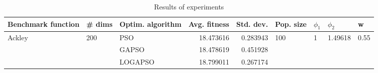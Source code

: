 \begin{table}
\centering
\caption{Results of experiments}
\begin{tabular}{lllrrllll}
\toprule
     Benchmark function &              \# dims & Optim. algorithm &  Avg. fitness &  Std. dev. &            Pop. size &         $\phi_{1}$ &               $\phi_{2}$ &                     w \\
\midrule
\multirow{3}{*}{Ackley} & \multirow{3}{*}{200} &              PSO &     18.473616 &   0.283943 & \multirow{3}{*}{100} & \multirow{3}{*}{1} & \multirow{3}{*}{1.49618} & \multirow{3}{*}{0.55} \\
                        &                      &            GAPSO &     18.478619 &   0.451928 &                      &                    &                          &                       \\
                        &                      &          LOGAPSO &     18.799011 &   0.267174 &                      &                    &                          &                       \\
\bottomrule
\end{tabular}
\end{table}
